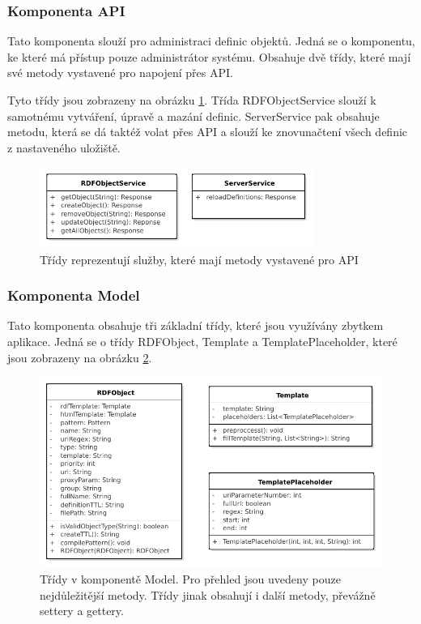 \documentclass[thesis=B,czech]{FITthesis}[2012/06/26]
\begin{document}
  \subsubsection{Komponenta API}
    Tato komponenta slouží pro administraci definic objektů. Jedná se o komponentu, ke které má přístup pouze administrátor systému. Obsahuje dvě třídy, které
    mají své metody vystavené pro napojení přes API.
    
    Tyto třídy jsou zobrazeny na obrázku \ref{api_class}. Třída RDFObjectService slouží k samotnému vytváření, úpravě a mazání definic. ServerService pak obsahuje
    metodu, která se dá taktéž volat přes API a slouží ke znovunačtení všech definic z nastaveného uložiště.
    \begin{figure}\centering
 	\includegraphics[width=0.8\textwidth]{API.pdf}
 	\caption[Model tříd API]{Třídy reprezentují služby, které mají metody vystavené pro API}\label{api_class}
    \end{figure}
    
    \subsubsection{Komponenta Model}
    Tato komponenta obsahuje tři základní třídy, které jsou využívány zbytkem aplikace. Jedná se o třídy RDFObject, Template a TemplatePlaceholder, které jsou zobrazeny
    na obrázku \ref{model_class}.
    
     \begin{figure}\centering
	\includegraphics[width=\textwidth]{Model.pdf}
	\caption[Model tříd komponenty model]{Třídy v komponentě Model. Pro přehled jsou uvedeny pouze nejdůležitější metody. Třídy jinak obsahují i další metody, převážně settery a gettery.}\label{model_class}
    \end{figure}
    
\end{document}
